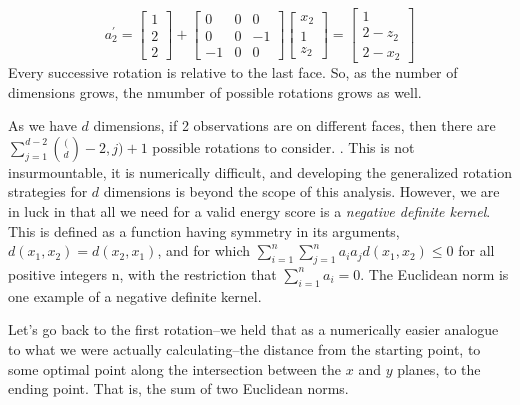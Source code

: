   \begin{equation}
    \label{eq:2drotation}
    a_2^{\prime} = \begin{bmatrix}
    1 \\
    2 \\
    2
    \end{bmatrix}
    +
    \begin{bmatrix}
    0 & 0 & 0  \\
    0 & 0 & -1 \\
    -1 & 0 & 0
    \end{bmatrix}
    \begin{bmatrix}
    x_2 \\
    1 \\
    z_2
    \end{bmatrix} = \begin{bmatrix}
    1 \\
    2 - z_2 \\
    2 - x_2
    \end{bmatrix}
  \end{equation}
Every successive rotation is relative to the last face.  So, as the number of dimensions grows, the
  nmumber of possible rotations grows as well.


As we have $d$ dimensions, if 2 observations are on different faces, then there are
  $\sum_{j = 1}^{d-2}\binom(d-2,j) + 1$ possible rotations to consider. .  This is not insurmountable, it is numerically difficult, and developing
  the generalized rotation strategies for $d$ dimensions is beyond the scope of this analysis.
  However, we are in luck in that all we need for a valid energy score is a
  \emph{negative definite kernel}.  This is defined as a function having symmetry in its arguments,
  $d(x_1,x_2) = d(x_2,x_1)$, and for which $\sum_{i =1}^n\sum_{j=1}^na_ia_jd(x_1,x_2) \leq 0$ for
  all positive integers n, with the restriction that $\sum_{i=1}^na_i = 0$.  The Euclidean norm
  is one example of a negative definite kernel.

Let's go back to the first rotation--we held that as a numerically easier analogue to what we were
  actually calculating--the distance from the starting point, to some optimal point along the
  intersection between the $x$ and $y$ planes, to the ending point.  That is, the sum of two
  Euclidean norms.



